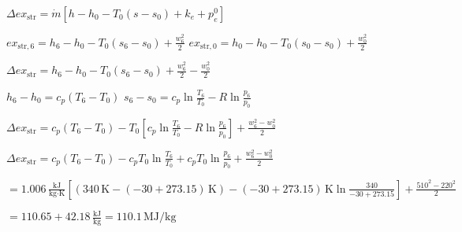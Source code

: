 \( \Delta ex_{\text{str}} = \dot{m} \left[ h - h_0 - T_0 (s - s_0) + k_e + p_e^0 \right] \)  

\( ex_{\text{str},6} = h_6 - h_0 - T_0 (s_6 - s_0) + \frac{w_6^2}{2} \)  
\( ex_{\text{str},0} = h_0 - h_0 - T_0 (s_0 - s_0) + \frac{w_0^2}{2} \)  

\( \Delta ex_{\text{str}} = h_6 - h_0 - T_0 (s_6 - s_0) + \frac{w_6^2}{2} - \frac{w_0^2}{2} \)  

\( h_6 - h_0 = c_p (T_6 - T_0) \)  
\( s_6 - s_0 = c_p \ln \frac{T_6}{T_0} - R \ln \frac{p_6}{p_0} \)  

\( \Delta ex_{\text{str}} = c_p (T_6 - T_0) - T_0 \left[ c_p \ln \frac{T_6}{T_0} - R \ln \frac{p_6}{p_0} \right] + \frac{w_6^2 - w_0^2}{2} \)  

\( \Delta ex_{\text{str}} = c_p (T_6 - T_0) - c_p T_0 \ln \frac{T_6}{T_0} + c_p T_0 \ln \frac{p_6}{p_0} + \frac{w_6^2 - w_0^2}{2} \)  

\( = 1.006 \, \frac{\text{kJ}}{\text{kg·K}} \left[ (340 \, \text{K} - (-30 + 273.15) \, \text{K}) - (-30 + 273.15) \, \text{K} \ln \frac{340}{-30 + 273.15} \right] + \frac{510^2 - 220^2}{2} \)  

\( = 110.65 + 42.18 \, \frac{\text{kJ}}{\text{kg}} = 110.1 \, \text{MJ/kg} \)